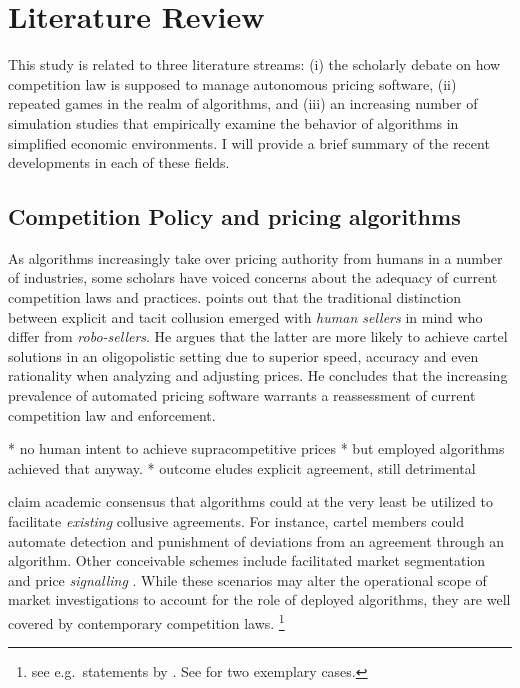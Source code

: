 \section{Literature Review}
This study is related to three literature streams: (i) the scholarly debate on how competition law is supposed to manage autonomous pricing software, (ii)  repeated games in the realm of algorithms, and (iii) an increasing number of simulation studies that empirically examine the behavior of algorithms in simplified economic environments. I will provide a brief summary of the recent developments in each of these fields.

\subsection{Competition Policy and pricing algorithms}
As algorithms increasingly take over pricing authority from humans in a number of industries, some scholars have voiced concerns about the adequacy of current competition laws and practices. \textcite{mehra_antitrust_2015} points out that the traditional distinction between explicit and tacit collusion emerged with \emph{human sellers} in mind who differ from \emph{robo-sellers}. He argues that the latter are more likely to achieve cartel solutions in an oligopolistic setting due to superior speed, accuracy and even rationality when analyzing and adjusting prices. He concludes that the increasing prevalence of automated pricing software warrants a reassessment of current competition law and enforcement. 

* no human intent to achieve supracompetitive prices
	* but employed algorithms achieved that anyway. 
	* outcome eludes explicit agreement, still detrimental

\textcite{ezrachi_sustainable_2018} claim academic consensus that algorithms could at the very least be utilized to facilitate \emph{existing} collusive agreements. For instance, cartel members could automate detection and punishment of deviations from an agreement through an algorithm. Other conceivable schemes include facilitated market segmentation \parencite{oefgen_decision_2019} and price \emph{signalling} \parencite{oecd_price_2016}. While these scenarios may alter the operational scope of market investigations to account for the role of deployed algorithms, they are well covered by contemporary competition laws.  \footnote{see e.g.\ statements by \cite{bundeskartellamt_bundeskartellamt_nodate}. See \textcite{cma_case_2016} \textcite{oefgen_decision_2019} for two exemplary cases.}




